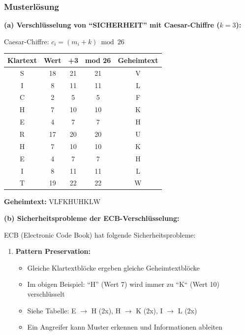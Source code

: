 \documentclass[12pt,a4paper]{article}
\begin{document}
\subsubsection*{Musterlösung}

\begin{tcolorbox}[colback=solutionbg, colframe=black!30]

\textbf{(a) Verschlüsselung von ``SICHERHEIT'' mit Caesar-Chiffre ($k=3$):} \checkmark

Caesar-Chiffre: $c_i = (m_i + k) \bmod 26$

\centering
\begin{tabular}{|c|c|c|c|c|}
    \hline
    \textbf{Klartext} & \textbf{Wert} & \textbf{+3} & \textbf{mod 26} & \textbf{Geheimtext} \\
    \hline
    S & 18 & 21 & 21 & V \\
    I & 8 & 11 & 11 & L \\
    C & 2 & 5 & 5 & F \\
    H & 7 & 10 & 10 & K \\
    E & 4 & 7 & 7 & H \\
    R & 17 & 20 & 20 & U \\
    H & 7 & 10 & 10 & K \\
    E & 4 & 7 & 7 & H \\
    I & 8 & 11 & 11 & L \\
    T & 19 & 22 & 22 & W \\
    \hline
\end{tabular}

\textbf{Geheimtext:} $\boxed{\text{VLFKHUHKLW}}$

\textbf{(b) Sicherheitsprobleme der ECB-Verschlüsselung:} \checkmark

ECB (Electronic Code Book) hat folgende Sicherheitsprobleme:

\begin{enumerate}[1.]
    \item \textbf{Pattern Preservation:}
    \begin{itemize}
        \item Gleiche Klartextblöcke ergeben gleiche Geheimtextblöcke
        \item Im obigen Beispiel: ``H'' (Wert 7) wird immer zu ``K`` (Wert 10) verschlüsselt
        \item Siehe Tabelle: E $\to$ H (2x), H $\to$ K (2x), I $\to$ L (2x)
        \item Ein Angreifer kann Muster erkennen und Informationen ableiten
    \end{itemize}
    

\end{enumerate}
\end{tcolorbox}
\end{document}
